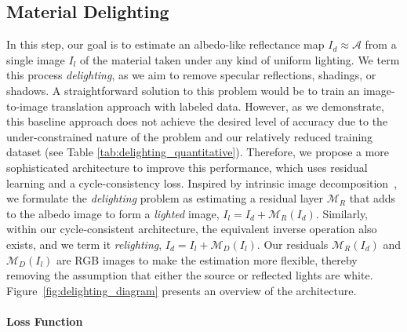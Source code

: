 \subsection{\textbf{Material Delighting}}
\label{sec:delighting}


In this step, our goal is to estimate an albedo-like reflectance map $I_{d} \approx \mathcal{A}$ from a single image $I_{l}$ of the material taken under any kind of uniform lighting. 
We term this process \textit{delighting}, as we aim to remove specular reflections, shadings, or shadows. 
A straightforward solution to this problem would be to train an image-to-image translation approach with labeled data. However, as we demonstrate, this baseline approach does not achieve the desired level of accuracy due to the under-constrained nature of the problem and our relatively reduced training dataset (see Table \ref{tab:delighting_quantitative}). Therefore, we propose a more sophisticated architecture to improve this performance, which uses residual learning and a cycle-consistency loss. 
Inspired by intrinsic image decomposition~\cite{garces2022survey}, we formulate the \textit{delighting} problem as estimating a residual layer $\mathcal{M}_R$ that adds to the albedo image to form a \textit{lighted} image, $I_{l} = I_{d} + \mathcal{M}_R (I_{d})$. Similarly, within our cycle-consistent architecture, the equivalent inverse operation also exists, and we term it \textit{relighting}, $I_{d} = I_{l} + \mathcal{M}_D (I_{l})$.
Our residuals $\mathcal{M}_R(I_{d})$ and $\mathcal{M}_D(I_{l})$ are RGB images to make the estimation more flexible, thereby removing the assumption that either the source or reflected lights are white. Figure~\ref{fig:delighting_diagram} presents an overview of the architecture.





\paragraph*{\textbf{Loss Function}}

